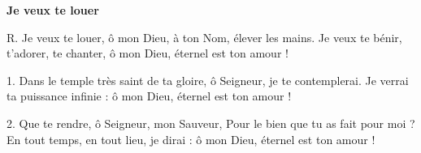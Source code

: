 \textbf{Je veux te louer}

R. Je veux te louer, ô mon Dieu, à ton Nom, élever les mains.
Je veux te bénir, t’adorer, te chanter, ô mon Dieu, éternel est ton amour !

1. Dans le temple très saint de ta gloire, ô Seigneur, je te contemplerai.
Je verrai ta puissance infinie : ô mon Dieu, éternel est ton amour !

2. Que te rendre, ô Seigneur, mon Sauveur, Pour le bien que tu as fait pour moi ? En tout temps, en tout lieu, je dirai : ô mon Dieu, éternel est ton amour !
